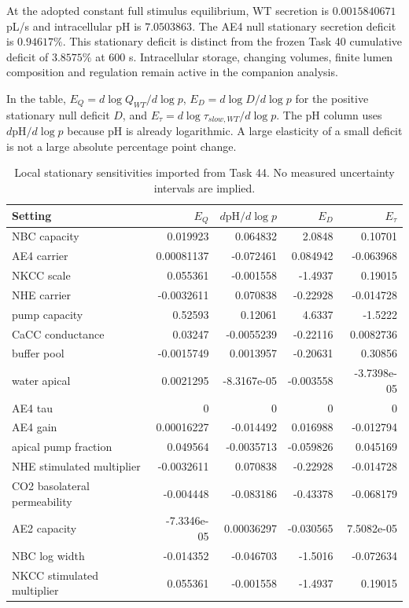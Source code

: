At the adopted constant full stimulus equilibrium, WT secretion is $0.0015840671$ pL/s and intracellular pH is $7.0503863$. The AE4 null stationary secretion deficit is $0.94617\%$. This stationary deficit is distinct from the frozen Task 40 cumulative deficit of $3.8575\%$ at 600 s. Intracellular storage, changing volumes, finite lumen composition and regulation remain active in the companion analysis.

In the table, $E_Q=d\log Q_{WT}/d\log p$, $E_D=d\log D/d\log p$ for the positive stationary null deficit $D$, and $E_{\tau}=d\log\tau_{slow,WT}/d\log p$. The pH column uses $d\mathrm{pH}/d\log p$ because pH is already logarithmic. A large elasticity of a small deficit is not a large absolute percentage point change.

\begin{table}[tbp]
\centering\small
\begin{tabular}{p{}rrrr}
\toprule Setting & $E_Q$ & $d\mathrm{pH}/d\log p$ & $E_D$ & $E_{\tau}$ \\ \midrule
NBC capacity & 0.019923 & 0.064832 & 2.0848 & 0.10701 \\
AE4 carrier & 0.00081137 & -0.072461 & 0.084942 & -0.063968 \\
NKCC scale & 0.055361 & -0.001558 & -1.4937 & 0.19015 \\
NHE carrier & -0.0032611 & 0.070838 & -0.22928 & -0.014728 \\
pump capacity & 0.52593 & 0.12061 & 4.6337 & -1.5222 \\
CaCC conductance & 0.03247 & -0.0055239 & -0.22116 & 0.0082736 \\
buffer pool & -0.0015749 & 0.0013957 & -0.20631 & 0.30856 \\
water apical & 0.0021295 & -8.3167e-05 & -0.003558 & -3.7398e-05 \\
AE4 tau & 0 & 0 & 0 & 0 \\
AE4 gain & 0.00016227 & -0.014492 & 0.016988 & -0.012794 \\
apical pump fraction & 0.049564 & -0.0035713 & -0.059826 & 0.045169 \\
NHE stimulated multiplier & -0.0032611 & 0.070838 & -0.22928 & -0.014728 \\
CO2 basolateral permeability & -0.004448 & -0.083186 & -0.43378 & -0.068179 \\
AE2 capacity & -7.3346e-05 & 0.00036297 & -0.030565 & 7.5082e-05 \\
NBC log width & -0.014352 & -0.046703 & -1.5016 & -0.072634 \\
NKCC stimulated multiplier & 0.055361 & -0.001558 & -1.4937 & 0.19015 \\
\bottomrule\end{tabular}
\caption{Local stationary sensitivities imported from Task 44. No measured uncertainty intervals are implied.}
\end{table}



